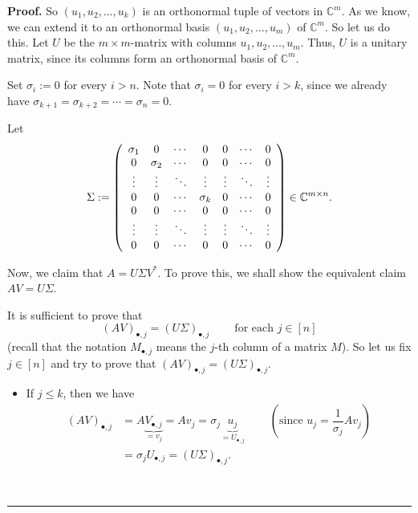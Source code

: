 \documentclass[numbers=enddot,12pt,final,onecolumn,notitlepage]{scrartcl}%
\numberwithin{exer}{subsection}
\theoremstyle{definition}
\newenvironment{proof}[1][Proof]{\noindent\textbf{#1.} }{\ \rule{0.5em}{0.5em}}
\begin{document}
\begin{proof}
So $\left(  u_{1},u_{2},\ldots,u_{k}\right)  $ is an orthonormal tuple of
vectors in $\mathbb{C}^{m}$. As we know, we can extend it to an orthonormal
basis $\left(  u_{1},u_{2},\ldots,u_{m}\right)  $ of $\mathbb{C}^{m}$. So let
us do this. Let $U$ be the $m\times m$-matrix with columns $u_{1},u_{2}%
,\ldots,u_{m}$. Thus, $U$ is a unitary matrix, since its columns form an
orthonormal basis of $\mathbb{C}^{m}$.

Set $\sigma_{i}:=0$ for every $i>n$. Note that $\sigma_{i}=0$ for every $i>k$,
since we already have $\sigma_{k+1}=\sigma_{k+2}=\cdots=\sigma_{n}=0$.

Let%
\[
\Sigma:=\left(
\begin{array}
[c]{ccccccc}%
\sigma_{1} & 0 & \cdots & 0 & 0 & \cdots & 0\\
0 & \sigma_{2} & \cdots & 0 & 0 & \cdots & 0\\
\vdots & \vdots & \ddots & \vdots & \vdots & \ddots & \vdots\\
0 & 0 & \cdots & \sigma_{k} & 0 & \cdots & 0\\
0 & 0 & \cdots & 0 & 0 & \cdots & 0\\
\vdots & \vdots & \ddots & \vdots & \vdots & \ddots & \vdots\\
0 & 0 & \cdots & 0 & 0 & \cdots & 0
\end{array}
\right)  \in\mathbb{C}^{m\times n}.
\]


Now, we claim that $A=U\Sigma V^{\ast}$. To prove this, we shall show the
equivalent claim $AV=U\Sigma$.

It is sufficient to prove that
\[
\left(  AV\right)  _{\bullet,j}=\left(  U\Sigma\right)  _{\bullet
,j}\ \ \ \ \ \ \ \ \ \ \text{for each }j\in\left[  n\right]
\]
(recall that the notation $M_{\bullet,j}$ means the $j$-th column of a matrix
$M$). So let us fix $j\in\left[  n\right]  $ and try to prove that $\left(
AV\right)  _{\bullet,j}=\left(  U\Sigma\right)  _{\bullet,j}$.

\begin{itemize}
\item If $j\leq k$, then we have%
\begin{align*}
\left(  AV\right)  _{\bullet,j}  & =A\underbrace{V_{\bullet,j}}_{=v_{j}%
}=Av_{j}=\sigma_{j}\underbrace{u_{j}}_{=U_{\bullet,j}}%
\ \ \ \ \ \ \ \ \ \ \left(  \text{since }u_{j}=\dfrac{1}{\sigma_{j}}%
Av_{j}\right)  \\
& =\sigma_{j}U_{\bullet,j}=\left(  U\Sigma\right)  _{\bullet,j}.
\end{align*}



\end{itemize}
\end{proof}
\end{document}
